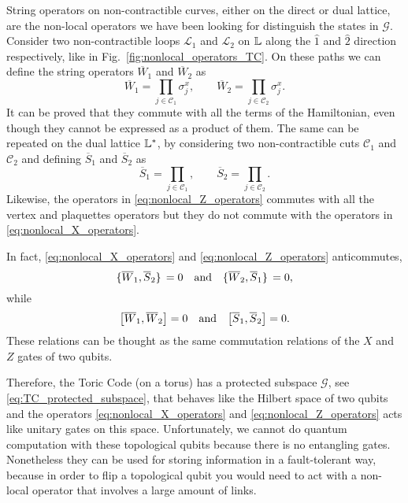 String operators on non-contractible curves, either on the direct or dual lattice, are the non-local operators we have been looking for distinguish the states in $\mathcal{G}$.
Consider two non-contractible loops $\mathcal{L}_{1}$ and $\mathcal{L}_{2}$ on $\mathbb{L}$ along the $\hat{1}$ and $\hat{2}$ direction respectively, like in Fig.~\ref{fig:nonlocal_operators_TC}.
On these paths we can define the string operators $\overline{W}_1$ and $\overline{W}_2$ as
\begin{equation}
    \overline{W}_1 = \prod_{j \in \mathcal{C}_1}  \sigma^x_j, \qquad
    \overline{W}_2 = \prod_{j \in \mathcal{C}_2}  \sigma^x_j.
    \label{eq:nonlocal_X_operators}
\end{equation}
It can be proved that they commute with all the terms of the Hamiltonian, even though they cannot be expressed as a product of them.
The same can be repeated on the dual lattice $\mathbb{L}^{\ast}$, by considering two non-contractible cuts $\mathcal{C}_1$ and $\mathcal{C}_2$ and defining $\overline{S}_1$ and $\overline{S}_2$ as
\begin{equation}
    \overline{S}_1 = \prod_{j \in \mathcal{C}_1}, \qquad
    \overline{S}_2 = \prod_{j \in \mathcal{C}_2}.
    \label{eq:nonlocal_Z_operators}
\end{equation}
Likewise, the operators in \eqref{eq:nonlocal_Z_operators} commutes with all the vertex and plaquettes operators but they do not commute with the operators in \eqref{eq:nonlocal_X_operators}.

In fact, \eqref{eq:nonlocal_X_operators} and \eqref{eq:nonlocal_Z_operators} anticommutes,
\begin{equation}
    \acomm*{\overline{W}_1}{\overline{S}_2} = 0 \qand
    \acomm*{\overline{W}_2}{\overline{S}_1} = 0,
\end{equation}
while
\begin{equation}
    \comm{\overline{W}_1}{\overline{W}_2} = 0 \qand
    \comm{\overline{S}_1}{\overline{S}_2} = 0.
\end{equation}
These relations can be thought as the same commutation relations of the $X$ and $Z$ gates of two qubits.

Therefore, the Toric Code (on a torus) has a protected subspace $\mathcal{G}$, see \eqref{eq:TC_protected_subspace}, that behaves like the Hilbert space of two qubits and the operators \eqref{eq:nonlocal_X_operators} and \eqref{eq:nonlocal_Z_operators} acts like unitary gates on this space.
Unfortunately, we cannot do quantum computation with these topological qubits because there is no entangling gates.
Nonetheless they can be used for storing information in a fault-tolerant way, because in order to flip a topological qubit you would need to act with a non-local operator that involves a large amount of links.



